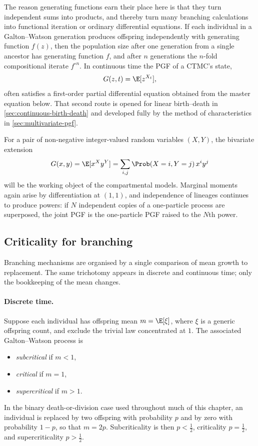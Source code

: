 The reason generating functions earn their place here is that they turn independent sums into products, and thereby turn many branching calculations into functional iteration or ordinary differential equations.  If each individual in a Galton--Watson generation produces offspring independently with generating function $f(z)$, then the population size after one generation from a single ancestor has generating function $f$, and after $n$ generations the $n$-fold compositional iterate $f^{\circ n}$.  In continuous time the PGF of a CTMC's state,
\[
  G(z,t)=\E[z^{X_t}],
\]
often satisfies a first-order partial differential equation obtained from the master equation below.  That second route is opened for linear birth--death in \cref{sec:continuous-birth-death} and developed fully by the method of characteristics in \cref{sec:multivariate-pgf}.

For a pair of non-negative integer-valued random variables $(X,Y)$, the bivariate extension
\begin{equation}
  G(x,y)
  =\E[x^X y^Y]
  =\sum_{i,j}\Prob(X=i,Y=j)\,x^i y^j
  \label{eq:bivariate-pgf-def}
\end{equation}
will be the working object of the compartmental models.  Marginal moments again arise by differentiation at $(1,1)$, and independence of lineages continues to produce powers: if $N$ independent copies of a one-particle process are superposed, the joint PGF is the one-particle PGF raised to the $N$th power.

\subsection{Criticality for branching}
\label{sec:criticality}

Branching mechanisms are organised by a single comparison of mean growth to replacement.  The same trichotomy appears in discrete and continuous time; only the bookkeeping of the mean changes.

\paragraph{Discrete time.}
Suppose each individual has offspring mean $m=\E[\xi]$, where $\xi$ is a generic offspring count, and exclude the trivial law concentrated at $1$.  The associated Galton--Watson process is
\begin{itemize}
  \item \emph{subcritical} if $m<1$,
  \item \emph{critical} if $m=1$,
  \item \emph{supercritical} if $m>1$.
\end{itemize}
In the binary death-or-division case used throughout much of this chapter, an individual is replaced by two offspring with probability $p$ and by zero with probability $1-p$, so that $m=2p$.  Subcriticality is then $p<\tfrac12$, criticality $p=\tfrac12$, and supercriticality $p>\tfrac12$.

